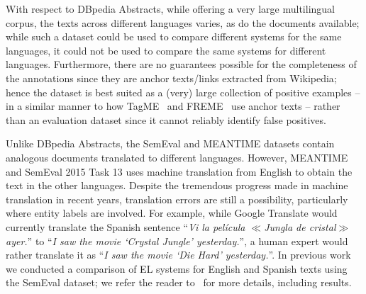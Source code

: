 \documentclass{llncs}
\begin{document}

With respect to DBpedia Abstracts, while offering a very large multilingual corpus, the texts across different languages varies, as do the documents available; while such a dataset could be used to compare different systems for the same languages, it could not be used to compare the same systems for different languages. Furthermore, there are no guarantees possible for the completeness of the annotations since they are anchor texts/links extracted from Wikipedia; hence the dataset is best suited as a (very) large collection of positive examples -- in a similar manner to how TagME~\cite{ferragina2010tagme} and FREME~\cite{freme-ner2016} use anchor texts -- rather than an evaluation dataset since it cannot reliably identify false positives.

Unlike DBpedia Abstracts, the SemEval and MEANTIME datasets contain analogous documents translated to different languages. However, MEANTIME and SemEval 2015 Task 13 uses machine translation from English to obtain the text in the other languages. Despite the tremendous progress made in machine translation in recent years, translation errors are still a possibility, particularly where entity labels are involved. For example, while Google Translate would currently translate the Spanish sentence ``\textit{Vi la pel\'icula {\scriptsize$\ll$}Jungla de cristal{\scriptsize$\gg$ }ayer.}'' to ``\textit{I saw the movie `Crystal Jungle' yesterday.}'', a human expert would rather translate it as ``\textit{I saw the movie `Die Hard' yesterday.}''. In previous work we conducted a comparison of EL systems for English and Spanish texts using the SemEval dataset; we refer the reader to~\cite{Rosales-MendezP17} for more details, including results.

\end{document}
